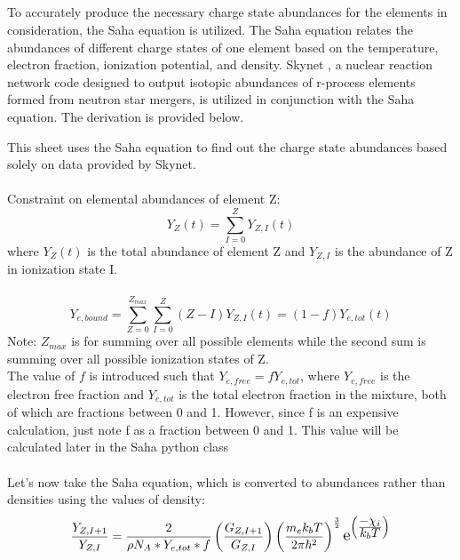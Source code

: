 \documentclass[11pt,a4paper]{article}
\begin{document}
\\\\
\\\\
To accurately produce the necessary charge state abundances for the elements in consideration, the Saha equation is utilized. The Saha equation relates the abundances of different charge states of one element based on the temperature, electron fraction, ionization potential, and density. Skynet \cite{lippuner2017skynet}, a nuclear reaction network code designed to output isotopic abundances of r-process elements formed from neutron star mergers, is utilized in conjunction with the Saha equation. The derivation is provided below.
\newpage

\maketitle   This sheet uses the Saha equation to find out the charge state abundances based solely on data provided by Skynet.
\\
\\
Constraint on elemental abundances of element Z:
$$Y_Z (t) = \sum_{I=0}^{Z} Y_{Z,I}(t)$$
where $Y_Z (t)$ is the total abundance of element Z and $Y_{Z,I}$ is the abundance of Z in ionization state I.
\\
\\
$$Y_{e,bound} = \sum_{Z=0}^{Z_{max}} \sum_{I=0}^{Z} (Z - I) Y_{Z,I}(t) = (1-f) Y_{e,tot}(t) $$
Note: $Z_{max}$ is for summing over all possible elements while the second sum is summing over all possible ionization states of Z. 
\\The value of $f$ is introduced such that $Y_{e,free} = f Y_{e,tot}$, where $Y_{e,free}$ is the electron free fraction and $Y_{e,tot}$ is the total electron fraction in the mixture, both of which are fractions between 0 and 1. However, since f is an expensive calculation, just note f as a fraction between 0 and 1. This value will be calculated later in the Saha python class 
\\\\Let's now take the Saha equation, which is converted to abundances rather than densities using the values of density: $$\frac{Y_{Z,I+1}}{Y_{Z,I}}  = \frac{2}{\rho N_A * Y_{e,tot}*f}  \left(\frac{G_{Z,I+1}}{G_{Z,I}}\right) \left(\frac{m_e k_b T}{2\pi\hbar^2}\right)^\frac{3}{2} \scalebox{1.3} e^{\left(\frac{\displaystyle -\chi_i}{\displaystyle k_b T}\right)} $$ \
\end{document}
